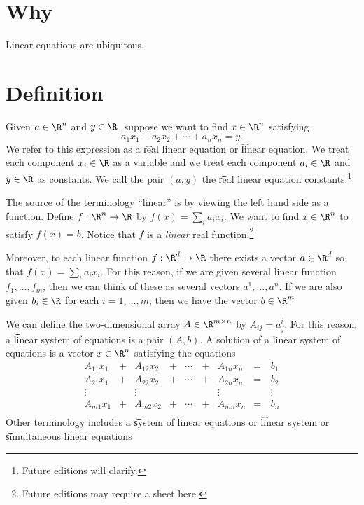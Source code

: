 

\section*{Why}

Linear equations are ubiquitous.

\section*{Definition}

Given $a \in \R ^n$ and $y \in \R $, suppose we want to find $x \in \R ^n$ satisfying
\[
a_1x_1 + a_2x_2 + \cdots + a_nx_n = y.
\]
We refer to this expression as a \t{real linear equation} or \t{linear equation}.
We treat each component $x_i \in \R $ as a variable and we treat each component $a_i \in \R $ and $y \in \R $ as constants.
We call the pair $(a, y)$ the \t{real linear equation constants}.\footnote{Future editions will clarify.}

The source of the terminology ``linear'' is by viewing the left hand side as a function.
Define $f: \R ^n \to \R $ by $f(x) = \sum_{i} a_ix_i$.
We want to find $x \in \R ^n$ to satisfy $f(x) = b$.
Notice that $f$ is a \textit{linear} real function.\footnote{Future editions may require a sheet here.}

Moreover, to each linear function $f: \R ^d \to \R $ there exists a vector $a \in \R ^d$ so that $f(x) = \sum_{i} a_ix_i$.
For this reason, if we are given several linear function $f_1, \dots , f_m$, then we can think of these as several vectors $a^1, \dots , a^n$.
If we are also given $b_i \in \R $ for each $i = 1, \dots , m$, then we have the vector $b \in \R ^m$

We can define the two-dimensional array $A \in \R ^{m \times n}$ by $A_{ij} = a^{i}_j$.
For this reason, a \t{linear system of equations} is a pair $(A, b)$.
A solution of a linear system of equations is a vector $x \in \R ^n$ satisfying the equations
\[
\begin{aligned}
A_{11}x_1 & + & A_{12}x_2 & + & \cdots \, & + & A_{1n}x_n & = \, & b_1 \\
A_{21}x_1 & + & A_{22}x_2 & + & \cdots & + & A_{2n}x_n & = & b_2 \\
\vdots & & \vdots & & & & \vdots & & \vdots \\
A_{m1}x_1 & + & A_{m2}x_2 & + & \cdots & + & A_{mn}x_n & = & b_n \\
\end{aligned}
\]
Other terminology includes a \t{system of linear equations} or \t{linear system} or \t{simultaneous linear equations}

\blankpage